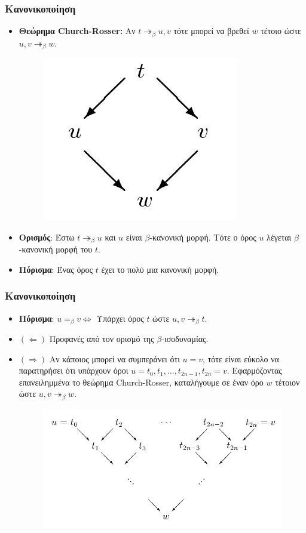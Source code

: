 \documentclass{beamer}
\begin{document}
\begin{frame}
\frametitle{Κανονικοποίηση}
\begin{itemize}
\item \textbf{Θεώρημα Church-Rosser:} Αν  $t \twoheadrightarrow _\beta u, v$  τότε μπορεί να βρεθεί $w$ τέτοιο ώστε $ u, v \twoheadrightarrow _\beta w$.\pause

\begin{figure}
\includegraphics[scale=0.3]{CR.jpg} 
\end{figure}\pause
\item \textbf{Ορισμός}: Έστω $t \twoheadrightarrow _\beta u$ και $u$ είναι $\beta$-κανονική μορφή. Τότε ο όρος $u$ λέγεται $\beta$-κανονική μορφή του $t$.\pause
\item \textbf{Πόρισμα}: Ένας όρος $t$ έχει το πολύ μια κανονική μορφή. 
\end{itemize}
\end{frame}

\begin{frame}
\frametitle{Κανονικοποίηση}
\begin{itemize}
\item \textbf{Πόρισμα}:  $u =_\beta v \Leftrightarrow$ Υπάρχει όρος $t$ ώστε $u, v \twoheadrightarrow _\beta t$.\pause
\item $(\Leftarrow)$ Προφανές από τον ορισμό της $\beta$-ισοδυναμίας.\pause
\item $(\Rightarrow)$ Aν  κάποιος μπορεί να συμπεράνει ότι $u = v$, τότε είναι εύκολο να παρατηρήσει ότι υπάρχουν όροι $u = t_0, t_1,\ldots, t_{2n-1}, t_{2n} = v$. Εφαρμόζοντας επανειλημμένα το θεώρημα Church-Rosser, καταλήγουμε σε έναν όρο	$w$ τέτοιον ώστε $u, v \twoheadrightarrow _\beta w$.\pause
\begin{figure} [!ht]
\centering
\includegraphics[scale=0.3] {CR1.jpg}
\end{figure}
\end{itemize}
\end{frame}
\end{document}
